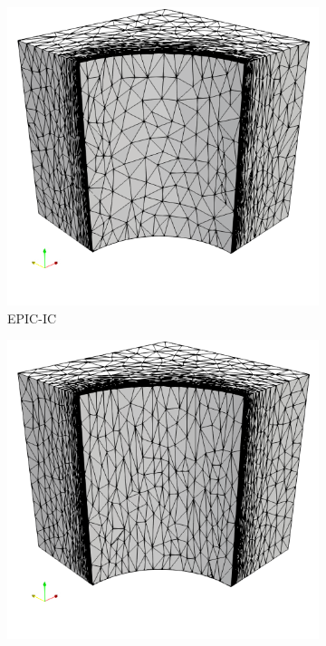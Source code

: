 \documentclass[3p,times,procedia,number]{elsarticle}
\begin{document}
\begin{figure}
\begin{subfigure}{.24\textwidth}
\centering
\includegraphics[width=\textwidth]{epic-ic-cube-cylinder-polar-1.png}
\caption{EPIC-IC}
\end{subfigure}
\begin{subfigure}{.24\textwidth}
\centering
\includegraphics[width=\textwidth]{epic-ics-cube-cylinder-polar-1.png}

\end{subfigure}
\end{figure}
\end{document}
